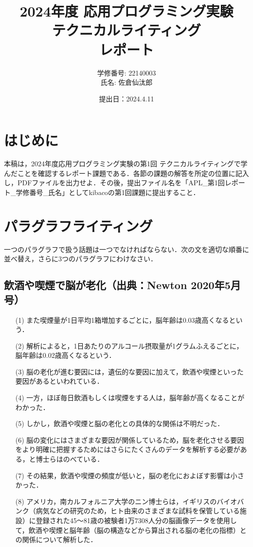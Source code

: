 \documentclass[11pt, a4paper]{jsarticle}
\title{
2024年度 応用プログラミング実験\\
テクニカルライティング\\
レポート}
\author{
学修番号: 22140003 \\
氏名: 佐倉仙汰郎 \\
}
\begin{document}
\date{提出日：2024.4.11}
\maketitle
\section*{はじめに}
本稿は，2024年度応用プログラミング実験の第1回 テクニカルライティングで学んだことを確認するレポート課題である．各節の課題の解答を所定の位置に記入し，PDFファイルを出力せよ．その後，提出ファイル名を「APL\_第1回レポート\_学修番号\_氏名」としてkibacoの第1回課題に提出すること．

\section{パラグラフライティング}
一つのパラグラフで扱う話題は一つでなければならない．次の文を適切な順番に並べ替え，さらに3つのパラグラフにわけなさい．

\subsection{飲酒や喫煙で脳が老化（出典：Newton 2020年5月号）}
\begin{itemize}
    \item[(1)]また喫煙量が1日平均1箱増加するごとに，脳年齢は0.03歳高くなるという．
    \item[(2)]解析によると，1日あたりのアルコール摂取量が1グラムふえるごとに，脳年齢は0.02歳高くなるという．
    \item[(3)]脳の老化が進む要因には，遺伝的な要因に加えて，飲酒や喫煙といった要因があるといわれている．
    \item[(4)]一方，ほぼ毎日飲酒もしくは喫煙をする人は，脳年齢が高くなることがわかった．
    \item[(5)]しかし，飲酒や喫煙と脳の老化との具体的な関係は不明だった．
    \item[(6)]脳の変化にはさまざまな要因が関係しているため，脳を老化させる要因をより明確に把握するためにはさらにたくさんのデータを解析する必要がある，と博士らはのべている．
    \item[(7)]その結果，飲酒や喫煙の頻度が低いと，脳の老化におよぼす影響は小さかった．
    \item[(8)]アメリカ，南カルフォルニア大学のニン博士らは，イギリスのバイオバンク（病気などの研究のため，ヒト由来のさまざまな試料を保管している施設）に登録された45～81歳の被験者1万7308人分の脳画像データを使用して，飲酒や喫煙と脳年齢（脳の構造などから算出される脳の老化の指標）との関係について解析した．
\end{itemize}
\end{document}
